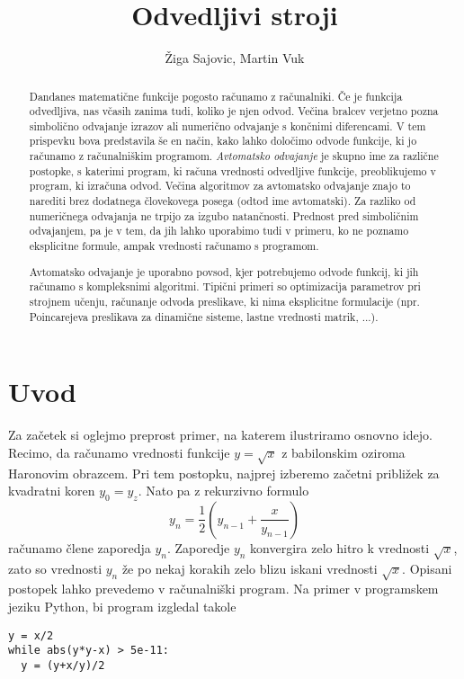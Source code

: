 \documentclass{article}
\title{Odvedljivi stroji}
\author{Žiga Sajovic, Martin Vuk}
\begin{document}
\maketitle
\begin{abstract}
  Dandanes matematične funkcije pogosto računamo z računalniki. Če je funkcija
  odvedljiva, nas včasih zanima tudi, koliko je njen odvod. Večina bralcev verjetno
  pozna simbolično odvajanje izrazov ali numerično odvajanje s končnimi
  diferencami. V tem prispevku bova predstavila še en način, kako lahko določimo
  odvode funkcije, ki jo računamo z računalniškim programom. \emph{Avtomatsko
    odvajanje} je skupno ime za različne postopke, s katerimi program, ki računa
  vrednosti odvedljive funkcije, preoblikujemo v program, ki izračuna odvod. 
  Večina algoritmov za avtomatsko odvajanje znajo to narediti brez dodatnega
  človekovega posega (odtod ime avtomatski). Za razliko
  od numeričnega odvajanja ne trpijo za izgubo natančnosti. Prednost pred
  simboličnim odvajanjem, pa je v tem, da jih lahko uporabimo tudi v primeru, ko
  ne poznamo eksplicitne formule, ampak vrednosti računamo s programom.

  Avtomatsko odvajanje je uporabno povsod, kjer potrebujemo 
  odvode funkcij, ki jih računamo s kompleksnimi algoritmi. Tipični primeri so
  optimizacija parametrov pri strojnem učenju, računanje odvoda preslikave, ki nima
  eksplicitne formulacije (npr. Poincarejeva preslikava za dinamične sisteme,
  lastne vrednosti matrik, ...).
\end{abstract}
\section{Uvod}
Za začetek si oglejmo preprost primer, na katerem ilustriramo osnovno idejo.
Recimo, da računamo vrednosti funkcije $y=\sqrt{x}$ z babilonskim oziroma Haronovim obrazcem.
Pri tem postopku, najprej izberemo začetni približek za
kvadratni koren $y_0=y_z$. Nato pa z rekurzivno formulo
\begin{equation*}
  y_n=\frac{1}{2}\left( y_{n-1}+\frac{x}{y_{n-1}} \right)
\end{equation*}
računamo člene zaporedja $y_n$. Zaporedje $y_n$ konvergira zelo hitro k
vrednosti $\sqrt{x}$, zato so vrednosti $y_n$ že po nekaj korakih zelo blizu
iskani vrednosti $\sqrt{x}$. Opisani postopek lahko prevedemo v računalniški
program. Na primer v programskem jeziku Python, bi program izgledal takole 

\begin{verbatim}
y = x/2
while abs(y*y-x) > 5e-11:
  y = (y+x/y)/2
\end{verbatim}
\end{document}
